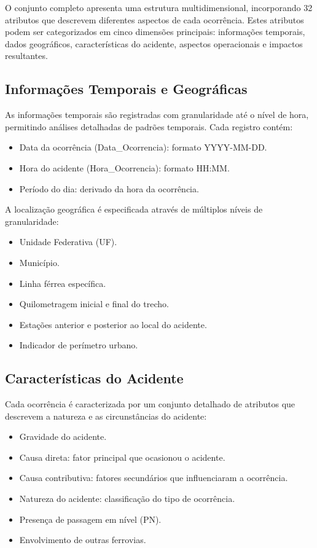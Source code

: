 \documentclass[conference]{IEEEtran}
\begin{document}
O conjunto completo apresenta uma estrutura multidimensional, incorporando 32 atributos que descrevem diferentes aspectos de cada ocorrência. Estes atributos podem ser categorizados em cinco dimensões principais: informações temporais, dados geográficos, características do acidente, aspectos operacionais e impactos resultantes.

\subsection{Informações Temporais e Geográficas}
As informações temporais são registradas com granularidade até o nível de hora, permitindo análises detalhadas de padrões temporais. Cada registro contém:

\begin{itemize}
\item Data da ocorrência (Data\_Ocorrencia): formato YYYY-MM-DD.
\item Hora do acidente (Hora\_Ocorrencia): formato HH:MM.
\item Período do dia: derivado da hora da ocorrência.
\end{itemize}

A localização geográfica é especificada através de múltiplos níveis de granularidade:
\begin{itemize}
\item Unidade Federativa (UF).
\item Município.
\item Linha férrea específica.
\item Quilometragem inicial e final do trecho.
\item Estações anterior e posterior ao local do acidente.
\item Indicador de perímetro urbano.
\end{itemize}

\subsection{Características do Acidente}
Cada ocorrência é caracterizada por um conjunto detalhado de atributos que descrevem a natureza e as circunstâncias do acidente:

\begin{itemize}
\item Gravidade do acidente.
\item Causa direta: fator principal que ocasionou o acidente.
\item Causa contributiva: fatores secundários que influenciaram a ocorrência.
\item Natureza do acidente: classificação do tipo de ocorrência.
\item Presença de passagem em nível (PN).
\item Envolvimento de outras ferrovias.
\end{itemize}
\end{document}
